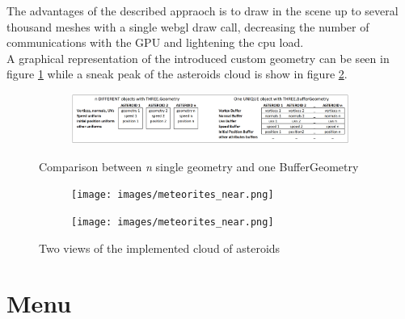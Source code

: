 \documentclass[paper=a4, fontsize=11pt]{scrartcl} %
\numberwithin{equation}{section} %
\numberwithin{figure}{section} %
\numberwithin{table}{section} %
\theoremstyle{definition}
\begin{document}
The advantages of the described appraoch is to draw in the scene up to several thousand meshes with a single webgl draw call, decreasing the number of communications with the GPU and lightening the cpu load.\\
A graphical representation of the introduced custom geometry can be seen in figure \ref{fig:buffer_geometry} while a sneak peak of the asteroids cloud is show in figure \ref{fig:meteorites}.

\begin{figure}
	\centering
	\begin{subfigure}{\textwidth}
		\centering
		\includegraphics[width=1.0\linewidth]{images/asteroids_geometry.png}
	\end{subfigure}
	\caption{Comparison between \textit{n} single geometry and one BufferGeometry}
	\label{fig:buffer_geometry}
\end{figure}

\begin{figure}
	\centering
	\begin{subfigure}{.4\textwidth}
		\centering
		\texttt{[image: images/meteorites\_near.png]}
	\end{subfigure}
	\begin{subfigure}{.4\textwidth}
		\centering
		\texttt{[image: images/meteorites\_near.png]}
	\end{subfigure}
	\caption{Two views of the implemented cloud of asteroids}
	\label{fig:meteorites}
\end{figure}

\section{Menu}
\end{document}
